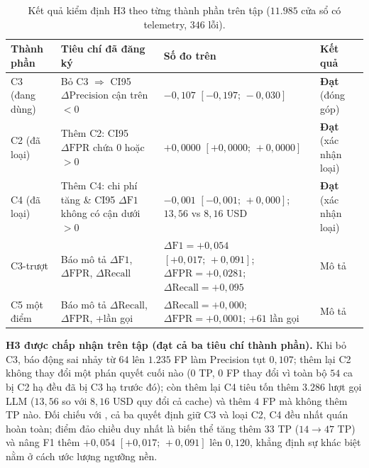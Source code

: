 \begin{table}[htbp]
  \centering
  \caption[Kiểm định giả thuyết H3 trên tập test]{Kết quả kiểm định H3 theo từng thành phần trên tập  ($11.985$ cửa sổ có telemetry, $346$ lỗi).}
  \label{tab:ch5-test-h3}
  \scriptsize
  \renewcommand{\arraystretch}{1.15}
  \setlength{\tabcolsep}{3pt}
  \begin{tabularx}{\linewidth}{@{}l Y >{\raggedright\arraybackslash}p{4.2cm} l@{}}
    \toprule
    \textbf{Thành phần} & \textbf{Tiêu chí đã đăng ký} & \textbf{Số đo trên } & \textbf{Kết quả} \\
    \midrule
    C3 (đang dùng) & Bỏ C3 $\Rightarrow$ CI95 $\Delta\text{Precision}$ cận trên $< 0$ & $-0{,}107$ $[-0{,}197;\, -0{,}030]$ & \textbf{Đạt} (đóng góp) \\
    C2 (đã loại) & Thêm C2: CI95 $\Delta\text{FPR}$ chứa $0$ hoặc $> 0$ & $+0{,}0000$ $[+0{,}0000;\, +0{,}0000]$ & \textbf{Đạt} (xác nhận loại) \\
    C4 (đã loại) & Thêm C4: chi phí tăng \& CI95 $\Delta\text{F1}$ không có cận dưới $> 0$ & $-0{,}001$ $[-0{,}001;\, +0{,}000]$; $13{,}56$ vs $8{,}16$ USD & \textbf{Đạt} (xác nhận loại) \\
    C3-trượt & Báo mô tả $\Delta\text{F1}$, $\Delta\text{FPR}$, $\Delta\text{Recall}$ & $\Delta\text{F1} = +0{,}054$ $[+0{,}017;\, +0{,}091]$; $\Delta\text{FPR} = +0{,}0281$; $\Delta\text{Recall} = +0{,}095$ & Mô tả \\
    C5 một điểm & Báo mô tả $\Delta\text{Recall}$, $\Delta\text{FPR}$, +lần gọi & $\Delta\text{Recall} = +0{,}000$; $\Delta\text{FPR} = +0{,}0001$; $+61$ lần gọi & Mô tả \\
    \bottomrule
  \end{tabularx}
\end{table}

\textbf{H3 được chấp nhận trên tập  (đạt cả ba tiêu chí thành phần).} Khi bỏ C3, báo động sai nhảy từ $64$ lên $1.235$ FP làm Precision tụt $0{,}107$; thêm lại C2 không thay đổi một phán quyết cuối nào ($0$ TP, $0$ FP thay đổi vì toàn bộ $54$ ca bị C2 hạ đều đã bị C3 hạ trước đó); còn thêm lại C4 tiêu tốn thêm $3.286$ lượt gọi LLM ($13{,}56$ so với $8{,}16$ USD quy đổi cả cache) và thêm $4$ FP mà không thêm TP nào. Đối chiếu với , cả ba quyết định giữ C3 và loại C2, C4 đều nhất quán hoàn toàn; điểm đảo chiều duy nhất là biến thể  tăng thêm $33$ TP ($14 \to 47$ TP) và nâng F1 thêm $+0{,}054$ $[+0{,}017;\, +0{,}091]$ lên $0{,}120$, khẳng định sự khác biệt nằm ở cách ước lượng ngưỡng nền.

